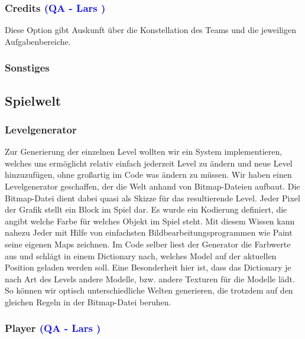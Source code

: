 \documentclass[12pt]{article}
\begin{document}
\vspace{1cm}
\subsubsection{Credits \textcolor{blue}{(QA - Lars )}}

Diese Option gibt Auskunft über die Konstellation des Teams und die jeweiligen Aufgabenbereiche.

\vspace{1cm}
\subsubsection{Sonstiges}

\vspace{2cm}
\subsection{Spielwelt}

\vspace{1cm}
\subsubsection{Levelgenerator}
Zur Generierung der einzelnen Level wollten wir ein System implementieren, welches uns ermöglicht relativ einfach jederzeit Level zu ändern und neue Level hinzuzufügen, ohne großartig im Code was ändern zu müssen.
Wir haben einen Levelgenerator geschaffen, der die Welt anhand von Bitmap-Dateien aufbaut. Die Bitmap-Datei dient dabei quasi als Skizze für das resultierende Level. Jeder Pixel der Grafik stellt ein Block im Spiel dar.
Es wurde ein Kodierung definiert, die angibt welche Farbe für welches Objekt im Spiel steht. Mit diesem Wissen kann nahezu Jeder mit Hilfe von einfachsten Bildbearbeitungsprogrammen wie Paint seine eigenen Maps zeichnen. \newline
Im Code selber liest der Generator die Farbwerte aus und schlägt in einem Dictionary nach, welches Model auf der aktuellen Position geladen werden soll.
Eine Besonderheit hier ist, dass das Dictionary je nach Art des Levels andere Modelle, bzw. andere Texturen für die Modelle lädt. So können wir optisch unterschiedliche Welten generieren, die trotzdem auf den gleichen Regeln in der Bitmap-Datei beruhen.

\vspace{1cm}
\subsubsection{Player \textcolor{blue}{(QA - Lars )}}
\end{document}
